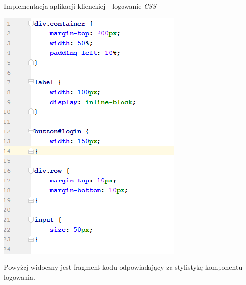\documentclass[10pt,titlepage]{article} %
\begin{document}
\begin{listing}[H]
\caption[Implementacja aplikacji klienckiej - logowanie \textit{CSS}]{Implementacja aplikacji klienckiej - logowanie \textit{CSS}}
\centering
\includegraphics[scale=0.7]{img/sekcja3/frontend/logowanieCss}
\end{listing}
Powyżej widoczny jest fragment kodu odpowiadający za stylistykę komponentu logowania.
\end{document}
